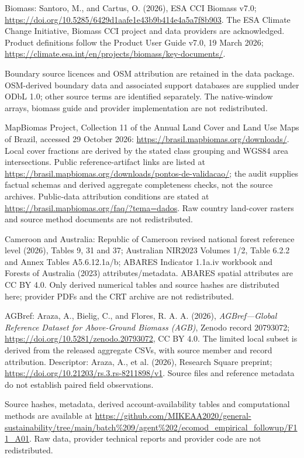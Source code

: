 \documentclass[11pt,a4paper]{article}
\begin{document}
Biomass: Santoro, M., and Cartus, O. (2026), ESA CCI Biomass v7.0; \url{https://doi.org/10.5285/6429d1aafe1e43b9b414e4a5a7f8b903}. The ESA Climate Change Initiative, Biomass CCI project and data providers are acknowledged. Product definitions follow the Product User Guide v7.0, 19 March 2026; \url{https://climate.esa.int/en/projects/biomass/key-documents/}.

Boundary source licences and OSM attribution are retained in the data package. OSM-derived boundary data and associated support databases are supplied under ODbL 1.0; other source terms are identified separately. The native-window arrays, biomass guide and provider implementation are not redistributed.

MapBiomas Project, Collection 11 of the Annual Land Cover and Land Use Maps of Brazil, accessed 29 October 2026: \url{https://brasil.mapbiomas.org/downloads/}. Local cover fractions are derived by the stated class grouping and WGS84 area intersections. Public reference-artifact links are listed at \url{https://brasil.mapbiomas.org/downloads/pontos-de-validacao/}; the audit supplies factual schemas and derived aggregate completeness checks, not the source archives. Public-data attribution conditions are stated at \url{https://brasil.mapbiomas.org/faq/?tema=dados}. Raw country land-cover rasters and source method documents are not redistributed.

Cameroon and Australia: Republic of Cameroon revised national forest reference level (2026), Tables 9, 31 and 37; Australian NIR2023 Volumes 1/2, Table 6.2.2 and Annex Tables A5.6.12.1a/b; ABARES Indicator 1.1a.iv workbook and Forests of Australia (2023) attributes/metadata. ABARES spatial attributes are CC BY 4.0. Only derived numerical tables and source hashes are distributed here; provider PDFs and the CRT archive are not redistributed.

AGBref: Araza, A., Bielig, C., and Flores, R. A. A. (2026), \emph{AGBref---Global Reference Dataset for Above-Ground Biomass (AGB)}, Zenodo record 20793072; \url{https://doi.org/10.5281/zenodo.20793072}, CC BY 4.0. The limited local subset is derived from the released aggregate CSVs, with source member and record attribution. Descriptor: Araza, A., et al. (2026), Research Square preprint; \url{https://doi.org/10.21203/rs.3.rs-8211898/v1}. Source files and reference metadata do not establish paired field observations.

Source hashes, metadata, derived account-availability tables and computational methods are available at \url{https://github.com/MIKEAA2020/general-sustainability/tree/main/batch%209/agent%202/ecomod_empirical_followup/F11_A01}. Raw data, provider technical reports and provider code are not redistributed.
\end{document}
